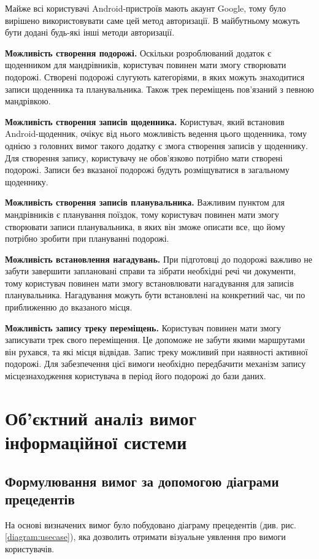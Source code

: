 \documentclass[../main.tex]{subfiles}
\begin{document}
Майже всі користувачі Android-пристроїв мають акаунт Google, тому було вирішено використовувати саме цей метод авторизації. В майбутньому можуть бути додані будь-які інші методи авторизації.

{\bfseries{Можливість створення подорожі.}}
Оскільки розроблюваний додаток є щоденником для мандрівників, користувач повинен мати змогу створювати подорожі. Створені подорожі слугують категоріями, в яких можуть знаходитися записи щоденника та планувальника. Також трек переміщень пов'язаний з певною мандрівкою.

{\bfseries{Можливість створення записів щоденника.}}
Користувач, який встановив Android-щоденник, очікує від нього можливість ведення цього щоденника, тому однією з головних вимог такого додатку є змога створення записів у щоденнику. Для створення запису, користувачу не обов'язково потрібно мати створені подорожі. Записи без вказаної подорожі будуть розміщуватися в загальному щоденнику.

{\bfseries{Можливість створення записів планувальника.}}
Важливим пунктом для мандрівників є планування поїздок, тому користувач повинен мати змогу створювати записи планувальника, в яких він зможе описати все, що йому потрібно зробити при плануванні подорожі.

{\bfseries{Можливість встановлення нагадувань.}}
При підготовці до подорожі важливо не забути завершити заплановані справи та зібрати необхідні речі чи документи, тому користувач повинен мати змогу встановлювати нагадування для записів планувальника. Нагадування можуть бути встановлені на конкретний час, чи по приближенню до вказаного місця.

{\bfseries{Можливість запису треку переміщень.}}
Користувач повинен мати змогу записувати трек свого переміщення. Це допоможе не забути якими маршрутами він рухався, та  які місця відвідав. Запис треку можливий при наявності активної подорожі. Для забезпечення цієї вимоги необхідно передбачити механізм запису місцезнаходження користувача в період його подорожі до бази даних.

\section{Об'єктний аналіз вимог інформаційної системи}

\subsection{Формулювання вимог за допомогою діаграми прецедентів}
На основі визначених вимог було побудовано діаграму прецедентів (див. рис. \ref{diagram:usecase}), яка дозволить отримати візуальне уявлення про вимоги користувачів.
\end{document}

